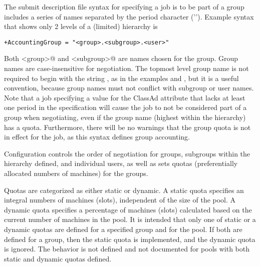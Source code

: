 The submit description file syntax for specifying a job is to be
part of a group includes 
a series of names separated by the period character ('').
Example syntax that shows only 2 levels of a (limited) hierarchy is
\begin{verbatim}
+AccountingGroup = "<group>.<subgroup>.<user>"
\end{verbatim}
Both \verb@<group>@ and \verb@<subgroup>@ are names chosen for the group.
Group names are case-insensitive for negotiation.
The topmost level group name is not required to begin with the
string ,
as in the examples
 and ,
but it is a useful convention,
because group names must not conflict with subgroup or user names.
Note that a job specifying a value for the 
ClassAd attribute that lacks at least one period in the specification
will cause the job to not be considered part of a group when negotiating,
even if the group name (highest within the hierarchy) has a quota.
Furthermore, there will be no warnings that the group quota is not
in effect for the job,
as this syntax defines group accounting.

Configuration controls the order of negotiation for
groups, subgroups within the hierarchy defined, and individual users,
as well as sets quotas
(preferentially allocated numbers of machines)
for the groups.

Quotas are categorized as either static or dynamic.
A static quota specifies an integral numbers of machines (slots),
independent of the size of the pool.
A dynamic quota specifies a percentage of machines (slots) calculated
based on the current number of machines in the pool.
It is intended that only one of static or a dynamic quotas are defined 
for a specified group and for the pool.
If both are defined for a group, then the static quota is implemented, 
and the dynamic quota is ignored.
The behavior is not defined and not documented
for pools with both static and dynamic quotas defined.

